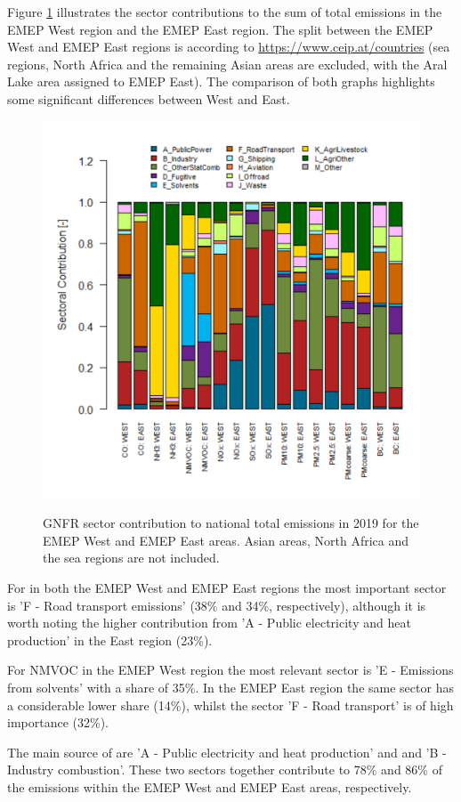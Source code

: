 Figure \ref{fig:CEIP7} illustrates the
sector contributions to the sum of total emissions in the EMEP West
region and the EMEP East region. The split between the EMEP West and EMEP East regions is according to  \url{https://www.ceip.at/countries} (sea regions, North Africa and the remaining Asian areas are excluded, with the Aral Lake area assigned to EMEP East). The comparison of both graphs highlights some significant differences between West and East. 
\begin{figure}[h]
\centering
{\includegraphics*[viewport=1 1 565 565,clip,width=0.65\linewidth]{FIGS_CEIP/Fig7.pdf}}
\caption{GNFR sector contribution to national total emissions in 2019
  for the EMEP West and EMEP East areas. Asian areas, North Africa and the sea regions are not included.}
\label{fig:CEIP7}
\end{figure}

For \nox in both the EMEP West and EMEP East regions the most important sector is 'F - Road transport emissions' (38\% and 34\%, respectively), although it is worth noting the higher contribution from  'A - Public electricity and heat production'  in the East region (23\%).

For NMVOC in the EMEP West region the most relevant sector is 'E - Emissions from solvents' with a share of 35\%. In the EMEP East region the same sector has a considerable lower share  (14\%), whilst the sector 'F - Road transport' is of high importance (32\%).

The main source of \sox are 'A - Public electricity and heat production'  and and 'B - Industry combustion'. These two sectors together contribute to 78\% and 86\%  of the \sox emissions within the EMEP West and EMEP East areas, respectively.


